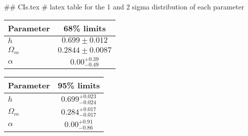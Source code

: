 ## CIs.tex
# latex table for the 1 and 2 sigma distribution of each parameter

\begin{tabular} { l  c}
 Parameter &  68\% limits\\
\hline
{\boldmath$h              $} & $0.699\pm 0.012            $\\
{\boldmath$\Omega_m       $} & $0.2844\pm 0.0087          $\\
{\boldmath$\alpha         $} & $0.00^{+0.39}_{-0.49}      $\\
\hline
\end{tabular}

\begin{tabular} { l  c}
 Parameter &  95\% limits\\
\hline
{\boldmath$h              $} & $0.699^{+0.023}_{-0.024}   $\\
{\boldmath$\Omega_m       $} & $0.284^{+0.017}_{-0.017}   $\\
{\boldmath$\alpha         $} & $0.00^{+0.91}_{-0.86}      $\\
\hline
\end{tabular}

